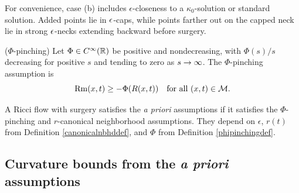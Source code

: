 \begin{remark}
  \label{rem:kl-priori-assumptions-continuation-kappa-solutions}
For convenience, case (b) includes $\epsilon$-closeness to a
$\kappa_0$-solution or standard solution. Added points lie in $\epsilon$-caps,
while points farther out on the capped neck lie in strong $\epsilon$-necks
extending backward before surgery.
\end{remark}

\begin{definition}
  \label{def:kl-priori-assumptions-curvature-pinching-assumption}

\label{phipinchingdef}
($\Phi$-pinching) Let $\Phi\in C^\infty({\mathbb R})$ be positive and nondecreasing,
with $\Phi(s)/s$ decreasing for positive $s$ and tending to zero as
$s\rightarrow\infty$. The $\Phi$-pinching assumption is
\[
\operatorname{Rm}(x,t)\geq-\Phi(R(x,t))\quad\text{for all }(x,t)\in{\mathcal M}.
\]
\end{definition}

\begin{definition}
  \label{def:kl-priori-assumptions-surgery-priori-assumptions}
 \label{apriori}
A Ricci flow with surgery satisfies the \emph{a priori} assumptions if it
satisfies the $\Phi$-pinching and $r$-canonical neighborhood assumptions.
They depend on $\epsilon$, $r(t)$ from Definition \ref{canonicalnbhddef},
and $\Phi$ from Definition \ref{phipinchingdef}.
\end{definition}

\subsection{Curvature bounds from the \emph{a priori} assumptions}

